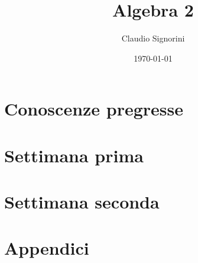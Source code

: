 \documentclass[a4paper,12pt]{book}
\title{Algebra 2}
\author{Claudio Signorini}
\date{\today}
\begin{document}
	
	
	
	\part{Conoscenze pregresse}
	
	
	
	
	
	
	\part{Settimana prima}
	
		
	
	
	
	\part{Settimana seconda}
	
	
	
	
	
	
	

	\part{Appendici}
	
	

	\printbibliography[heading=bibintoc,title={Bibliografia}]

	\listoffigures

	\tableofcontents
\end{document}

